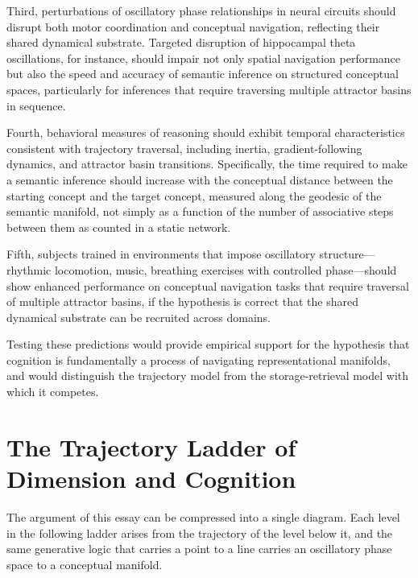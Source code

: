 \documentclass[11pt, a4paper]{article}
\theoremstyle{plain}
\theoremstyle{definition}
\theoremstyle{remark}
\begin{document}
Third, perturbations of oscillatory phase relationships in neural circuits should disrupt
both motor coordination and conceptual navigation, reflecting their shared dynamical
substrate. Targeted disruption of hippocampal theta oscillations, for instance, should
impair not only spatial navigation performance but also the speed and accuracy of
semantic inference on structured conceptual spaces, particularly for inferences that
require traversing multiple attractor basins in sequence.

Fourth, behavioral measures of reasoning should exhibit temporal characteristics
consistent with trajectory traversal, including inertia, gradient-following dynamics,
and attractor basin transitions. Specifically, the time required to make a semantic
inference should increase with the conceptual distance between the starting concept and
the target concept, measured along the geodesic of the semantic manifold, not simply as
a function of the number of associative steps between them as counted in a static network.

Fifth, subjects trained in environments that impose oscillatory structure---rhythmic
locomotion, music, breathing exercises with controlled phase---should show enhanced
performance on conceptual navigation tasks that require traversal of multiple attractor
basins, if the hypothesis is correct that the shared dynamical substrate can be
recruited across domains.

Testing these predictions would provide empirical support for the hypothesis that
cognition is fundamentally a process of navigating representational manifolds, and would
distinguish the trajectory model from the storage-retrieval model with which it competes.


\section{The Trajectory Ladder of Dimension and Cognition}

The argument of this essay can be compressed into a single diagram. Each level in the
following ladder arises from the trajectory of the level below it, and the same
generative logic that carries a point to a line carries an oscillatory phase space to a
conceptual manifold.
\end{document}
